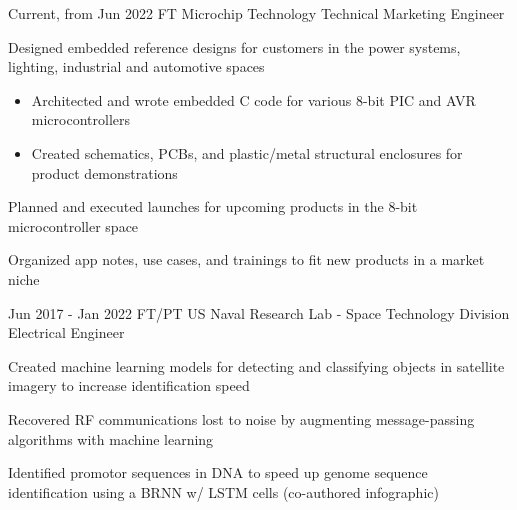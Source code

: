 \documentclass[
	10pt, %
]{FreemanCV}
\begin{document}
\jobentry
	{Current, from Jun 2022} %
	{FT} %
	{Microchip Technology} %
	{Technical Marketing Engineer} %
	{ %
		\item Designed embedded reference designs for customers in the power systems, lighting, industrial and automotive spaces
		\begin{itemize}[topsep=-10pt]
			\itemsep-5pt
			\item Architected and wrote embedded C code for various 8-bit PIC and AVR microcontrollers 
			\item Created schematics, PCBs, and plastic/metal structural enclosures for product demonstrations
		\end{itemize}
		\item Planned and executed launches for upcoming products in the 8-bit microcontroller space
		\item Organized app notes, use cases, and trainings to fit new products in a market niche

	} 


\jobentry
	{Jun 2017 - Jan 2022} %
	{FT/PT} %
	{US Naval Research Lab - Space Technology Division} %
	{Electrical Engineer} %
	{ %
		\item Created machine learning models for detecting and classifying objects in satellite imagery to increase identification speed
		\item Recovered RF communications lost to noise by augmenting message-passing algorithms with machine learning
		\item Identified promotor sequences in DNA to speed up genome sequence identification using a BRNN w/ LSTM cells (co-authored infographic)
	} 
\end{document}

